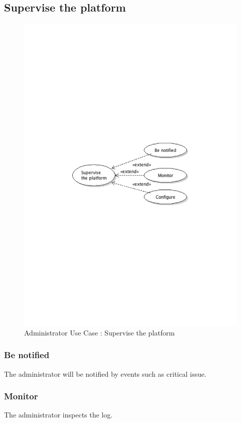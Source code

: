 	\subsection{Supervise the platform}
		\begin{figure}[ht]
			\begin{center}
				\includegraphics[width=\textwidth, trim=2cm 12cm 2cm 12cm]{UML_figure/UC/administrator/UC_Administrator_Supervise.pdf}
				\caption{Administrator Use Case : Supervise the platform}
			\end{center}
		\end{figure}
		\subsubsection{Be notified}
			The administrator will be notified by events such as critical issue.
		\subsubsection{Monitor}
			The administrator inspects the log.
